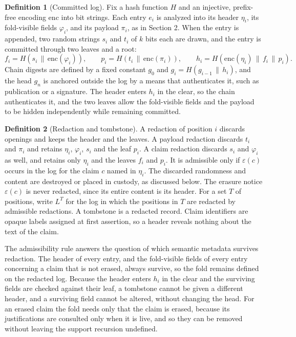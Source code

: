 \documentclass[11pt]{article}
\theoremstyle{plain}
\theoremstyle{definition}
\newtheorem{definition}{Definition}
\theoremstyle{remark}
\begin{document}
\begin{definition}[Committed log]
Fix a hash function $H$ and an injective, prefix-free encoding $\mathrm{enc}$ into bit strings. Each entry $e_i$ is analyzed into its header $\eta_i$, its fold-visible fields $\varphi_i$, and its payload $\pi_i$, as in Section 2. When the entry is appended, two random strings $s_i$ and $t_i$ of $k$ bits each are drawn, and the entry is committed through two leaves and a root:
\[
f_i=H(s_i\,\|\,\mathrm{enc}(\varphi_i)),\qquad p_i=H(t_i\,\|\,\mathrm{enc}(\pi_i)),\qquad h_i=H(\mathrm{enc}(\eta_i)\,\|\,f_i\,\|\,p_i).
\]
Chain digests are defined by a fixed constant $g_0$ and $g_i=H(g_{i-1}\,\|\,h_i)$, and the head $g_n$ is anchored outside the log by a means that authenticates it, such as publication or a signature. The header enters $h_i$ in the clear, so the chain authenticates it, and the two leaves allow the fold-visible fields and the payload to be hidden independently while remaining committed.
\end{definition}

\begin{definition}[Redaction and tombstone]
A redaction of position $i$ discards openings and keeps the header and the leaves. A payload redaction discards $t_i$ and $\pi_i$ and retains $\eta_i$, $\varphi_i$, $s_i$ and the leaf $p_i$. A claim redaction discards $s_i$ and $\varphi_i$ as well, and retains only $\eta_i$ and the leaves $f_i$ and $p_i$. It is admissible only if $\varepsilon(c)$ occurs in the log for the claim $c$ named in $\eta_i$. The discarded randomness and content are destroyed or placed in custody, as discussed below. The erasure notice $\varepsilon(c)$ is never redacted, since its entire content is its header. For a set $T$ of positions, write $L^T$ for the log in which the positions in $T$ are redacted by admissible redactions. A tombstone is a redacted record. Claim identifiers are opaque labels assigned at first assertion, so a header reveals nothing about the text of the claim.
\end{definition}

The admissibility rule answers the question of which semantic metadata survives redaction. The header of every entry, and the fold-visible fields of every entry concerning a claim that is not erased, always survive, so the fold remains defined on the redacted log. Because the header enters $h_i$ in the clear and the surviving fields are checked against their leaf, a tombstone cannot be given a different header, and a surviving field cannot be altered, without changing the head. For an erased claim the fold needs only that the claim is erased, because its justifications are consulted only when it is live, and so they can be removed without leaving the support recursion undefined.
\end{document}
